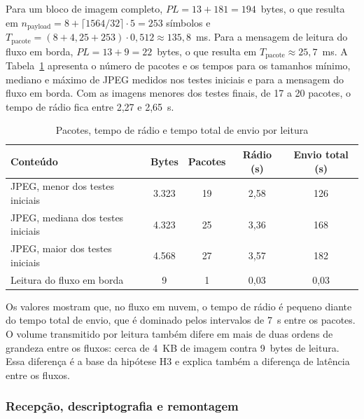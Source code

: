 Para um bloco de imagem completo, $PL = 13 + 181 = 194$~bytes, o que resulta em
$n_{\text{payload}} = 8 + \lceil 1564/32 \rceil \cdot 5 = 253$ símbolos e
$T_{\text{pacote}} = (8 + 4{,}25 + 253) \cdot 0{,}512 \approx 135{,}8$~ms. Para a
mensagem de leitura do fluxo em borda, $PL = 13 + 9 = 22$~bytes, o que resulta em
$T_{\text{pacote}} \approx 25{,}7$~ms. A Tabela~\ref{tab:tempo_no_ar} apresenta o número
de pacotes e os tempos para os tamanhos mínimo, mediano e máximo de JPEG medidos nos testes
iniciais e para a mensagem do fluxo em borda. Com as imagens menores dos testes finais, de 17 a 20 pacotes, o
tempo de rádio fica entre 2,27 e 2,65~s.

\begin{table}[H]
    \centering
    \caption{Pacotes, tempo de rádio e tempo total de envio por leitura}
    \label{tab:tempo_no_ar}
    \begin{tabular}{@{}lcccc@{}}
        \toprule
        \textbf{Conteúdo} & \textbf{Bytes} & \textbf{Pacotes} &
        \textbf{Rádio (s)} & \textbf{Envio total (s)} \\
        \midrule
        JPEG, menor dos testes iniciais & 3.323 & 19 & 2,58 & 126 \\
        JPEG, mediana dos testes iniciais & 4.323 & 25 & 3,36 & 168 \\
        JPEG, maior dos testes iniciais & 4.568 & 27 & 3,57 & 182 \\
        Leitura do fluxo em borda & 9 & 1 & 0,03 & 0,03 \\
        \bottomrule
    \end{tabular}
\end{table}

Os valores mostram que, no fluxo em nuvem, o tempo de rádio é pequeno diante do tempo
total de envio, que é dominado pelos intervalos de 7~s entre os pacotes. O volume
transmitido por leitura também difere em mais de duas ordens de grandeza entre os
fluxos: cerca de 4~KB de imagem contra 9~bytes de leitura. Essa diferença é a base da
hipótese H3 e explica também a diferença de latência entre os fluxos.

\subsubsection{Recepção, descriptografia e remontagem}
\label{subsubsec:recepcao}

